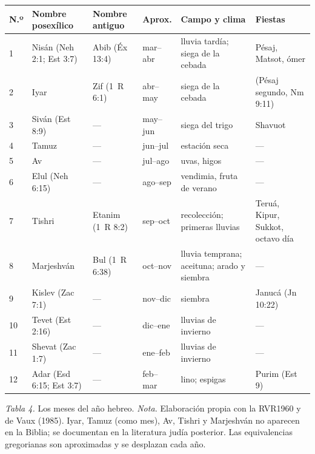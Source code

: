 \documentclass[11pt,letterpaper]{article}
\begin{document}
\begin{center}\begin{minipage}{\linewidth}\centering\small\renewcommand{\arraystretch}{1.16}
\begin{tabular}{@{}L{0.6cm}L{2.2cm}L{2.0cm}L{1.6cm}L{3.8cm}L{4.1cm}@{}}
\toprule
\textbf{N.º} & \textbf{Nombre posexílico} & \textbf{Nombre antiguo} & \textbf{Aprox.} & \textbf{Campo y clima} & \textbf{Fiestas} \\  & Nisán (Neh 2:1; Est 3:7) & Abib (Éx 13:4) & mar--abr & lluvia tardía; siega de la cebada & Pésaj, Matsot, ómer \\
2 & Iyar & Zif (1~R 6:1) & abr--may & siega de la cebada & (Pésaj segundo, Nm 9:11) \\
3 & Siván (Est 8:9) & --- & may--jun & siega del trigo & Shavuot \\
4 & Tamuz & --- & jun--jul & estación seca & --- \\
5 & Av & --- & jul--ago & uvas, higos & --- \\
6 & Elul (Neh 6:15) & --- & ago--sep & vendimia, fruta de verano & --- \\
7 & Tishri & Etanim (1~R 8:2) & sep--oct & recolección; primeras lluvias & Teruá, Kipur, Sukkot, octavo día \\
8 & Marjeshván & Bul (1~R 6:38) & oct--nov & lluvia temprana; aceituna; arado y siembra & --- \\
9 & Kislev (Zac 7:1) & --- & nov--dic & siembra & Janucá (Jn 10:22) \\
10 & Tevet (Est 2:16) & --- & dic--ene & lluvias de invierno & --- \\
11 & Shevat (Zac 1:7) & --- & ene--feb & lluvias de invierno & --- \\
12 & Adar (Esd 6:15; Est 3:7) & --- & feb--mar & lino; espigas & Purim (Est 9) \\
\bottomrule
\end{tabular}\par
{\footnotesize\color{sepia}\textit{Tabla 4.} Los meses del año hebreo. \textit{Nota.} Elaboración propia con la RVR1960 y de Vaux (1985). Iyar, Tamuz (como mes), Av, Tishri y Marjeshván no aparecen en la Biblia; se documentan en la literatura judía posterior. Las equivalencias gregorianas son aproximadas y se desplazan cada año.}
\end{minipage}\end{center}
\end{document}
